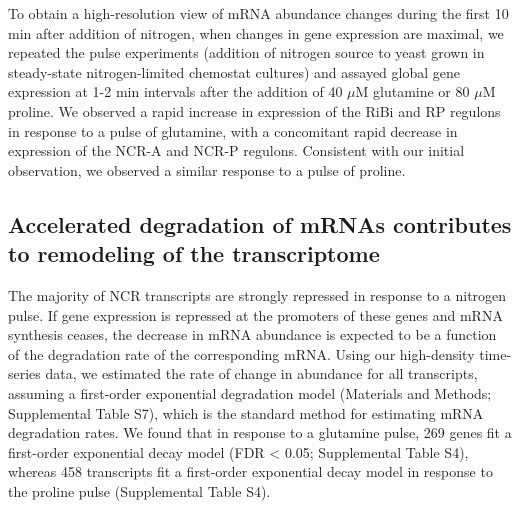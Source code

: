 To obtain a high-resolution view of mRNA abundance
changes during the first 10 min after addition of nitrogen, when
changes in gene expression are maximal, we repeated the
pulse experiments (addition of nitrogen source to yeast grown in
steady-state nitrogen-limited chemostat cultures) and assayed global
gene expression at 1-2 min intervals after the addition of 40 $\mu$M
glutamine or 80 $\mu$M proline. We observed a rapid increase in expression
of the RiBi and RP regulons in response to a pulse of glutamine, with
a concomitant rapid decrease in expression of the NCR-A and NCR-P
regulons. Consistent with our initial observation, we observed a
similar response to a pulse of proline. 

\subsection{Accelerated degradation of
mRNAs contributes to remodeling of the transcriptome }

The majority of
NCR transcripts are strongly repressed in response to a nitrogen
pulse. If gene expression is repressed at the promoters of these genes
and mRNA synthesis ceases, the decrease in mRNA abundance is expected
to be a function of the degradation rate of the corresponding mRNA.
Using our high-density time-series data, we estimated the rate of
change in abundance for all transcripts, assuming a first-order
exponential degradation model (Materials and Methods; Supplemental
Table S7), which is the standard method for estimating mRNA
degradation rates. We found that in response to a glutamine pulse, 269
genes fit a first-order exponential decay model (FDR < 0.05;
Supplemental Table S4), whereas 458 transcripts fit a first-order
exponential decay model in response to the proline pulse (Supplemental
Table S4).  

\newpage

